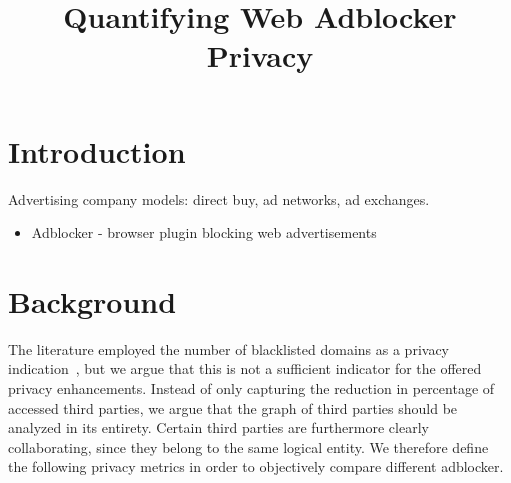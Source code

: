 \documentclass{sig-alternate}
\begin{document}
\title{Quantifying Web Adblocker Privacy}
\author{}


\maketitle

\begin{abstract}
\end{abstract}

\section{Introduction} \label{sec:introduction}

Advertising company models: direct buy, ad networks, ad exchanges.

\begin{itemize}
\item Adblocker - browser plugin blocking web advertisements
\end{itemize}


\section{Background} \label{sec:background}
The literature employed the number of blacklisted domains as a privacy indication~\cite{XX}, but we argue that this is not a sufficient indicator for the offered privacy enhancements. Instead of only capturing the reduction in percentage of accessed third parties, we argue that the graph of third parties should be analyzed in its entirety. Certain third parties are furthermore clearly collaborating, since they belong to the same logical entity. We therefore define the following privacy metrics in order to objectively compare different adblocker.
\end{document}
